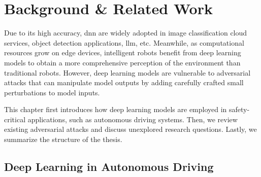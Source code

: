 \chapter{Background \& Related Work}
\label{chpt:intro}

Due to its high accuracy, \acrfull{dnn} are widely adopted in image classification cloud services, object detection applications, \acrfull{llm}, etc. Meanwhile, as computational resources grow on edge devices, intelligent robots benefit from deep learning models to obtain a more comprehensive perception of the environment than traditional robots. However, deep learning models are vulnerable to adversarial attacks that can manipulate model outputs by adding carefully crafted small perturbations to model inputs.

This chapter first introduces how deep learning models are employed in safety-critical applications, such as autonomous driving systems. Then, we review existing adversarial attacks and discuss unexplored research questions. Lastly, we summarize the structure of the thesis.


\section{Deep Learning in Autonomous Driving}
\label{sec:deep_learning}


